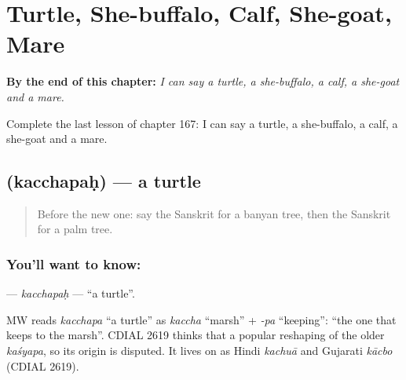 
\chapter{Turtle, She-buffalo, Calf, She-goat, Mare}
\label{ch:sa-turtle-she-buffalo-calf-she-goat-mare}

\begin{chapteropening}
\textbf{By the end of this chapter:} \emph{I can say a turtle, a she-buffalo, a calf, a she-goat and a mare.}

Complete the last lesson of chapter 167: I can say a turtle, a she-buffalo, a calf, a she-goat and a mare.
\end{chapteropening}

\section[\texorpdfstring{\sk{कच्छपः} (kacchapaḥ)}{कच्छपः (kacchapaḥ)}]{ (kacchapaḥ) — a turtle}

\label{lesson:SA-C167-kacchapah}



\begin{quote}
Before the new one: say the Sanskrit for a banyan tree, then the Sanskrit for a palm tree.
\end{quote}

\subsection*{You'll want to know: }
\textbf{} — \emph{kacchapaḥ} — \textquotedblleft{}a turtle\textquotedblright{}.

\begin{cousinweb}
MW reads \emph{kacchapa} \textquotedblleft{}a turtle\textquotedblright{} as \emph{kaccha} \textquotedblleft{}marsh\textquotedblright{} + \emph{-pa} \textquotedblleft{}keeping\textquotedblright{}: \textquotedblleft{}the one that keeps to the marsh\textquotedblright{}. CDIAL 2619 thinks that a popular reshaping of the older \emph{kaśyapa}, so its origin is disputed. It lives on as Hindi \emph{kachuā} and Gujarati \emph{kācbo} (CDIAL 2619).
\end{cousinweb}

